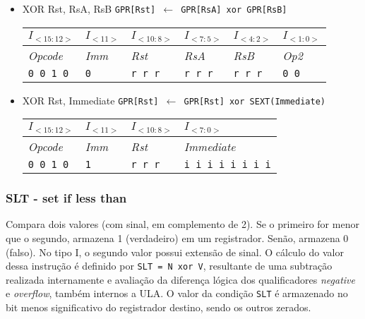 \documentclass{extreport}
\begin{document}
\begin{itemize}
\item XOR Rst, RsA, RsB
\subitem \texttt{GPR[Rst] $\leftarrow$ GPR[RsA] xor GPR[RsB]}
\begin{table}[ht!]
\centering
\begin{tabular}{|p{1.6cm}|p{1.6cm}|p{1.6cm}|p{1.6cm}|p{1.6cm}|p{1.6cm}|}
\hline
$I_{<15:12>}$ & $I_{<11>}$ & $I_{<10:8>}$ & $I_{<7:5>}$ & $I_{<4:2>}$ & $I_{<1:0>}$ \\ \hline
\textit{Opcode} & \textit{Imm} & \textit{Rst} & \textit{RsA} & \textit{RsB} & \textit{Op2} \\ \hline
\texttt{0 0 1 0} & \texttt{0} & \texttt{r r r} & \texttt{r r r} & \texttt{r r r} & \texttt{0 0} \\ \hline
\end{tabular}
\end{table}

\item XOR Rst, Immediate
\subitem \texttt{GPR[Rst] $\leftarrow$ GPR[Rst] xor SEXT(Immediate)}
\begin{table}[ht!]
\centering
\begin{tabular}{|p{1.6cm}|p{1.6cm}|p{1.6cm}|p{5.65cm}|}
\hline
$I_{<15:12>}$ & $I_{<11>}$ & $I_{<10:8>}$ & $I_{<7:0>}$ \\ \hline
\textit{Opcode} & \textit{Imm} & \textit{Rst} & \textit{Immediate} \\ \hline
\texttt{0 0 1 0} & \texttt{1} & \texttt{r r r} & \texttt{i i i i i i i i} \\ \hline
\end{tabular}
\end{table}
\end{itemize}

\subsubsection{SLT - set if less than}
Compara dois valores (com sinal, em complemento de 2). Se o primeiro for menor que o segundo, armazena 1 (verdadeiro) em um registrador. Senão, armazena 0 (falso). No tipo I, o segundo valor possui extensão de sinal. O cálculo do valor dessa instrução é definido por \texttt{SLT = N xor V}, resultante de uma subtra\c{c}\~{a}o realizada internamente e avaliação da diferença lógica dos qualificadores \textit{negative} e \textit{overflow}, também internos a ULA. O valor da condição \texttt{SLT} é armazenado no bit menos significativo do registrador destino, sendo os outros zerados.
\end{document}
